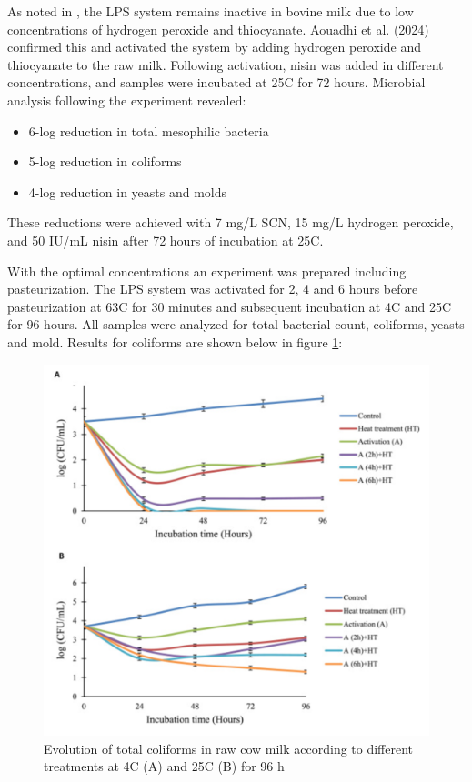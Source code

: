 As noted in \cite*{RM_01}, the LPS system remains inactive in bovine milk due to low concentrations of hydrogen peroxide and thiocyanate. Aouadhi et al. (2024) confirmed this and activated the system by adding hydrogen peroxide and thiocyanate to the raw milk. Following activation, nisin was added in different concentrations, and samples were incubated at 25\textdegree C for 72 hours. Microbial analysis following the experiment revealed:
\begin{itemize}
    \item 6-log reduction in total mesophilic bacteria
    \item 5-log reduction in coliforms
    \item 4-log reduction in yeasts and molds
\end{itemize}


These reductions were achieved with 7 mg/L SCN, 15 mg/L hydrogen peroxide, and 50 IU/mL nisin after 72 hours of incubation at 25\textdegree C. 

\vline 

With the optimal concentrations an experiment was prepared including pasteurization. The LPS system was activated for 2, 4 and 6 hours before pasteurization at 63\textdegree C for 30 minutes and subsequent incubation at 4\textdegree C and 25\textdegree C for 96 hours. All samples were analyzed for total bacterial count, coliforms, yeasts and mold. Results for coliforms are shown below in figure \ref*{fig_02}:

\begin{figure}[h]
    \center
    \includegraphics[width=0.8\linewidth]{Figures/fig_01.png}
    \caption{Evolution of total coliforms in raw cow milk according to different treatments at 4\textdegree C (A) and 25\textdegree C (B) for 96 h \cite{RM_02}}
    \label{fig_02}
\end{figure}

